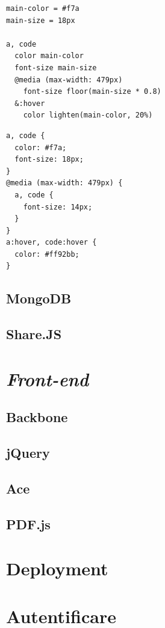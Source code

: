 \documentclass[a4wide,12pt]{report}
\newcommand{\eng}[1]{\emph{#1}} %
\begin{document}
\minipage{9cm}
\begin{verbatim}
main-color = #f7a
main-size = 18px

a, code
  color main-color
  font-size main-size
  @media (max-width: 479px)
    font-size floor(main-size * 0.8)
  &:hover
    color lighten(main-color, 20%)
\end{verbatim}
\endminipage
\minipage{4cm}
\begin{verbatim}
a, code {
  color: #f7a;
  font-size: 18px;
}
@media (max-width: 479px) {
  a, code {
    font-size: 14px;
  }
}
a:hover, code:hover {
  color: #ff92bb;
}
\end{verbatim}
\endminipage

\subsection{MongoDB}

\subsection{Share.JS}

\section{\eng{Front-end}}

\subsection{Backbone}

\subsection{jQuery}

\subsection{Ace}

\subsection{PDF.js}

\section{Deployment}

\section{Autentificare}
\end{document}
